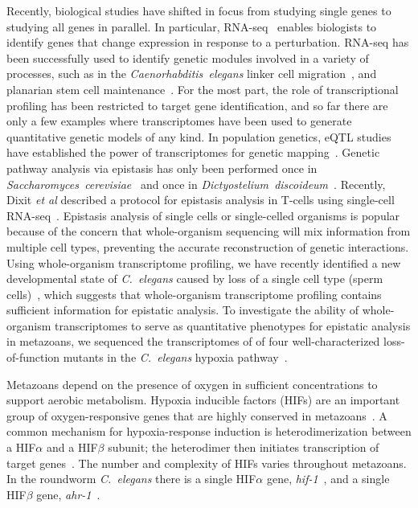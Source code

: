 \documentclass[9pt,twocolumn,twoside]{pnas-new}
\newcommand{\cel}{\emph{C.~elegans}}
\newcommand{\gene}[1]{\mbox{\emph{#1}}}
\begin{document}
Recently, biological studies have shifted in focus from studying single
genes to studying all genes in parallel. In particular,
RNA-seq~\cite{Mortazavi2008} enables biologists to
identify genes that change expression in response to a perturbation.
RNA-seq has been successfully used to identify genetic modules involved in a
variety of processes, such as in the \emph{Caenorhabditis~elegans} linker cell
migration~\cite{Schwarz2012}, and planarian stem cell
maintenance~\cite{VanWolfswinkel2014,Scimone2014}. For the most part, the role
of transcriptional profiling has been restricted to target gene identification,
and so far there are only a few examples where transcriptomes have been used to
generate quantitative genetic models of any kind. In population genetics, eQTL
studies have established the power of transcriptomes for genetic
mapping~\cite{Brem2002,Schadt2003,Li2006,King2014}. Genetic pathway analysis via
epistasis has only been performed once in
\emph{Saccharomyces~cerevisiae}~\cite{Hughes2000} and once in
\emph{Dictyostelium~discoideum}~\cite{VanDriessche2005}. Recently, Dixit
\emph{et al} described a protocol for epistasis analysis in T-cells using
single-cell RNA-seq~\cite{Dixit2016}. Epistasis analysis of single cells or
single-celled organisms is popular because of the concern that whole-organism
sequencing will mix information from multiple cell types, preventing the
accurate reconstruction of genetic interactions. Using whole-organism
transcriptome profiling, we have recently identified a new developmental state
of \cel{} caused by loss of a single cell type (sperm
cells)~\cite{Angeles-Albores2016a}, which suggests that whole-organism
transcriptome profiling contains sufficient information for epistatic analysis.
To investigate the ability of whole-organism transcriptomes to serve as
quantitative phenotypes for epistatic analysis in metazoans, we sequenced the
transcriptomes of of four well-characterized loss-of-function mutants in the
\cel{} hypoxia pathway~\cite{Epstein2001,Shen2006,Shao2009,Jiang2001}.

Metazoans depend on the presence of oxygen in sufficient concentrations to
support aerobic metabolism. Hypoxia inducible factors (HIFs) are an
important group of oxygen-responsive genes that are highly conserved in
metazoans~\cite{Loenarz2011}. A common mechanism for hypoxia-response induction
is heterodimerization between a HIF$\alpha$ and a HIF$\beta$ subunit; the
heterodimer then initiates transcription of target genes~\cite{Jiang1996}. The
number and complexity of HIFs varies throughout metazoans. In the roundworm
\cel{} there is a single HIF$\alpha$ gene, \gene{hif-1}~\cite{Jiang2001}, and a
single HIF$\beta$ gene, \gene{ahr-1}~\cite{Powell-Coffman1998}.
\end{document}
